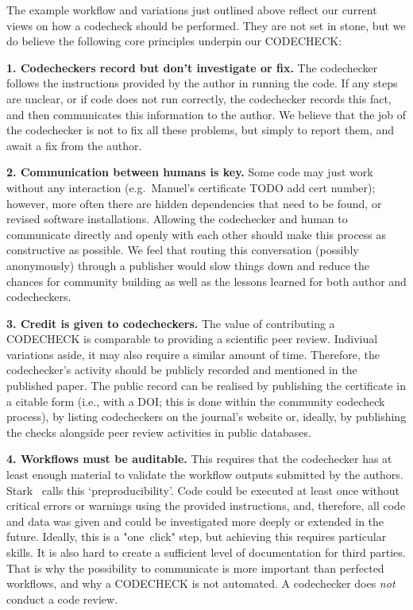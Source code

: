 \documentclass[12pt]{article}
\begin{document}
The example workflow and variations just outlined above reflect our current
views on how a codecheck should be performed. They are not set in
stone, but we do believe the following core principles underpin our
CODECHECK:

\textbf{1. Codecheckers record but don't investigate or fix.} The
codechecker follows the instructions provided by the author in running
the code. If any steps are unclear, or if code does not run correctly,
the codechecker records this fact, and then communicates this
information to the author. We believe that the job of the codechecker is
not to fix all these problems, but simply to report them, and await a
fix from the author.

\textbf{2. Communication between humans is key.} Some code may just work
without any interaction (e.g.~Manuel's certificate TODO add cert number); 
however, more often
there are hidden dependencies that need to be found, or revised software
installations. Allowing the codechecker and human to communicate
directly and openly with each other should make this process as
constructive as possible. We feel that routing this conversation
(possibly anonymously) through a publisher would slow things down and
reduce the chances for community building as well as the lessons learned
for both author and codecheckers.

\textbf{3. Credit is given to codecheckers.} The value of contributing a
CODECHECK is comparable to providing a scientific peer review. Indiviual
variations aside, it may also require a similar amount of time. Therefore,
the codechecker's activity should be publicly recorded and mentioned in the
published paper.
The public record can be realised by publishing the certificate in a 
citable form (i.e., with a DOI; this is done within the community codecheck
process), by listing codecheckers on the journal's website or, ideally, by
publishing the checks alongside peer review activities in public databases.

\textbf{4. Workflows must be auditable.} This requires that the codechecker 
has at least enough material to validate the workflow outputs submitted by 
the authors. Stark~\cite{stark_before_2018} calls this `preproducibility'.
Code could be executed at least once without critical errors or
warnings using the provided instructions, and, therefore, all code and data 
was given and could be investigated more deeply or extended in the future.
Ideally, this is a "one~click" step, but achieving this requires particular 
skills. It is also hard to create a sufficient level of documentation for 
third parties. That is why the possibility to communicate is more important
than perfected workflows, and why a CODECHECK is not automated.
A codechecker does \emph{not} conduct a code review.
\end{document}
